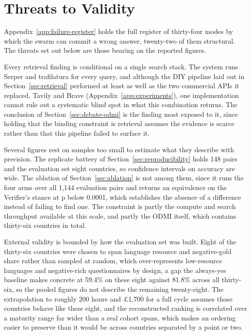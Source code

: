 \section{Threats to Validity}\label{sec:threats}

Appendix~\ref{app:failure-register} holds the full register of thirty-four modes by which the swarm can commit a wrong answer, twenty-two of them structural. The threats set out below are those bearing on the reported figures.

Every retrieval finding is conditional on a single search stack. The system runs Serper and trafilatura for every query, and although the DIY pipeline laid out in Section~\ref{sec:retrieval} performed at least as well as the two commercial APIs it replaced, Tavily and Brave (Appendix~\ref{app:experiments}), one implementation cannot rule out a systematic blind spot in what this combination returns. The conclusion of Section~\ref{sec:debate-odmi} is the finding most exposed to it, since holding that the binding constraint is retrieval assumes the evidence is scarce rather than that this pipeline failed to surface it.

Several figures rest on samples too small to estimate what they describe with precision. The replicate battery of Section~\ref{sec:reproducibility} holds 148 pairs and the evaluation set eight countries, so confidence intervals on accuracy are wide. The ablation of Section~\ref{sec:ablation} is not among them, since it runs the four arms over all 1,144 evaluation pairs and returns an equivalence on the Verifier's stance at p below 0.0001, which establishes the absence of a difference instead of failing to find one. The constraint is partly the compute and search throughput available at this scale, and partly the ODMI itself, which contains thirty-six countries in total.

External validity is bounded by how the evaluation set was built. Eight of the thirty-six countries were chosen to span language resource and negative-gold share rather than sampled at random, which over-represents low-resource languages and negative-rich questionnaires by design, a gap the always-yes baseline makes concrete at 59.4\% on these eight against 81.8\% across all thirty-six, so the pooled figures do not describe the remaining twenty-eight. The extrapolation to roughly 200 hours and \pounds{}1,700 for a full cycle assumes those countries behave like these eight, and the reconstructed ranking is correlated over a maturity range far wider than a real cohort spans, which makes an ordering easier to preserve than it would be across countries separated by a point or two.

